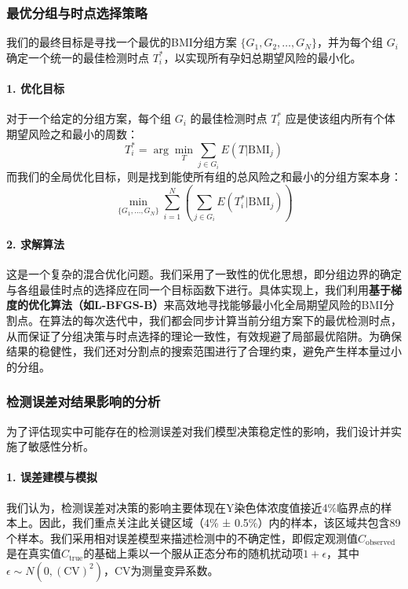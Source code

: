 \documentclass[12pt,a4paper]{ctexart}
\numberwithin{equation}{section}
\theoremstyle{mcm}
\begin{document}
\subsubsection{最优分组与时点选择策略}

我们的最终目标是寻找一个最优的BMI分组方案 $\{G_1, G_2, \dots, G_N\}$，并为每个组 $G_i$ 确定一个统一的最佳检测时点 $T_i^*$，以实现所有孕妇总期望风险的最小化。

\paragraph{1. 优化目标}
对于一个给定的分组方案，每个组 $G_i$ 的最佳检测时点 $T_i^*$ 应是使该组内所有个体期望风险之和最小的周数：
\begin{equation}
    T_i^* = \arg\min_{T} \sum_{j \in G_i} E(T | \text{BMI}_j)
\end{equation}
而我们的全局优化目标，则是找到能使所有组的总风险之和最小的分组方案本身：
\begin{equation}
    \min_{\{G_1, \dots, G_N\}} \sum_{i=1}^{N} \left( \sum_{j \in G_i} E(T_i^* | \text{BMI}_j) \right)
\end{equation}

\paragraph{2. 求解算法}
这是一个复杂的混合优化问题。我们采用了一致性的优化思想，即分组边界的确定与各组最佳时点的选择应在同一个目标函数下进行。具体实现上，我们利用\textbf{基于梯度的优化算法（如L-BFGS-B）}来高效地寻找能够最小化全局期望风险的BMI分割点。在算法的每次迭代中，我们都会同步计算当前分组方案下的最优检测时点，从而保证了分组决策与时点选择的理论一致性，有效规避了局部最优陷阱。为确保结果的稳健性，我们还对分割点的搜索范围进行了合理约束，避免产生样本量过小的分组。

\subsubsection{检测误差对结果影响的分析}

为了评估现实中可能存在的检测误差对我们模型决策稳定性的影响，我们设计并实施了敏感性分析。

\paragraph{1. 误差建模与模拟}
我们认为，检测误差对决策的影响主要体现在Y染色体浓度值接近4\%临界点的样本上。因此，我们重点关注此关键区域（4\% ± 0.5\%）内的样本，该区域共包含89个样本。我们采用相对误差模型来描述检测中的不确定性，即假定观测值$C_{\text{observed}}$是在真实值$C_{\text{true}}$的基础上乘以一个服从正态分布的随机扰动项$1 + \epsilon$，其中$\epsilon \sim N(0, (\text{CV})^2)$，CV为测量变异系数。
\end{document}
